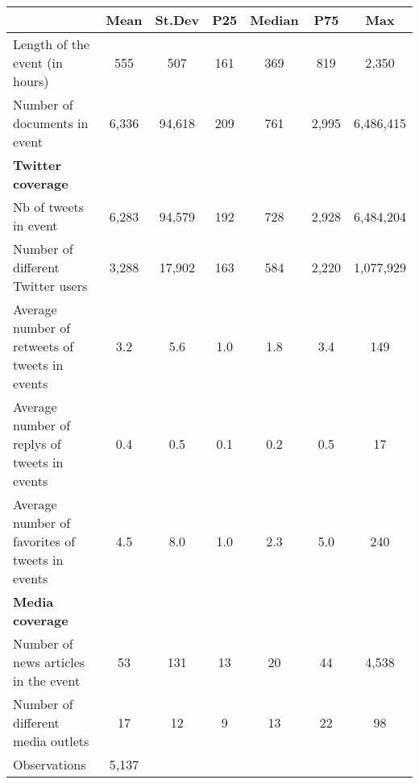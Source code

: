 {
\def\sym#1{\ifmmode^{#1}\else\(^{#1}\)\fi}
\begin{tabular}{l*{1}{cccccc}}
\hline\hline
                    &        Mean&      St.Dev&         P25&      Median&         P75&         Max\\
\hline
Length of the event (in hours)&         555&         507&         161&         369&         819&       2,350\\
Number of documents in event&       6,336&      94,618&         209&         761&       2,995&   6,486,415\\
\textbf{Twitter coverage}&            &            &            &            &            &            \\
Nb of tweets in event&       6,283&      94,579&         192&         728&       2,928&   6,484,204\\
Number of different Twitter users&       3,288&      17,902&         163&         584&       2,220&   1,077,929\\
Average number of retweets of tweets in events&         3.2&         5.6&         1.0&         1.8&         3.4&         149\\
Average number of replys of tweets in events&         0.4&         0.5&         0.1&         0.2&         0.5&          17\\
Average number of favorites of tweets in events&         4.5&         8.0&         1.0&         2.3&         5.0&         240\\
\textbf{Media coverage}&            &            &            &            &            &            \\
Number of news articles in the event&          53&         131&          13&          20&          44&       4,538\\
Number of different media outlets&          17&          12&           9&          13&          22&          98\\
\hline
Observations        &       5,137&            &            &            &            &            \\
\hline\hline
\end{tabular}
}
